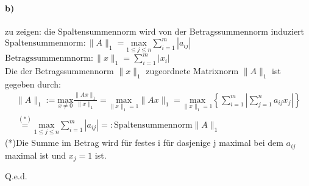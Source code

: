 \paragraph*{b)}
zu zeigen: die Spaltensummennorm wird von der Betragssummennorm induziert\\
\newline
$\mathrm{Spaltensummennorm: }\|A\|_1=\underset{1 \le j \le n}{\mathrm{max}} \sum_{i=1}^{m}|a_{ij}|$\\
\newline
$\mathrm{Betragssummenmnorm: }\|x\|_1=\sum_{i=1}^{m}|x_i|$\\
\newline
Die der Betragssummennorm $\|x\|_1$ zugeordnete Matrixnorm $\|A\|_1$ ist gegeben durch:
\begin{align}
\|A\|_1 := \underset{x\neq 0}{\mathrm{max}} \frac{\|Ax\|_1}{\|x\|_1} = \underset{\|x\|_1=1}{\mathrm{max}} \|Ax\|_1 = \underset{\|x\|_1=1}{\mathrm{max}}\left\lbrace\sum_{i=1}^{m}\left|\sum_{j=1}^{n}a_{ij}x_j\right|\right\rbrace \\
\overset{(*)}{=} \underset{1 \le j \le n}{\mathrm{max}} \sum_{i=1}^{m}|a_{ij}| =: \mathrm{Spaltensummennorm} \|A\|_1
\end{align}
(*)Die Summe im Betrag wird f\"ur festes i f\"ur dasjenige j maximal bei dem $a_{ij}$ maximal ist und $x_j = 1$ ist.
\begin{flushright}Q.e.d.\end{flushright}
